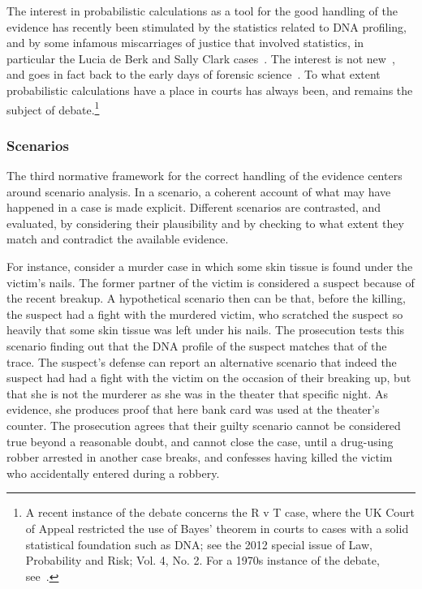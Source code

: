 \documentclass[10pt]{article}
\begin{document}
The interest in probabilistic calculations as a tool for the good handling of the evidence has recently been stimulated by the statistics related to DNA profiling, and by some infamous miscarriages of justice that involved statistics, in particular the Lucia de Berk and Sally Clark cases~\citep{dawidEtal2011,fenton2011,schnepsColmez2013}. The interest is not new~\citep{tillers2011}, and goes in fact back to the early days of forensic science~\citep{taroniEtal1998}. To what extent probabilistic calculations have a place in courts has always been, and remains the subject of debate.\footnote{A recent instance of the debate concerns the R v T case, where the UK Court of Appeal restricted the use of Bayes' theorem in courts to cases with a solid statistical foundation such as DNA; see the 2012 special issue of Law, Probability and Risk; Vol. 4, No. 2. For a 1970s instance of the debate, see~\citet{finkelsteinFairley1970,tribe1971}.}

\subsubsection{Scenarios}

The third normative framework for the correct handling of the evidence centers around scenario analysis. In a scenario, a coherent account of what may have happened in a case is made explicit. Different scenarios are contrasted, and evaluated, by considering their plausibility and by checking to what extent they match and contradict the available evidence. 

For instance, consider a murder case in which some skin tissue is found under the victim's nails. The former partner of the victim is considered a suspect because of the recent breakup. A hypothetical scenario then can be that, before the killing, the suspect had a fight with the murdered victim, who scratched the suspect so heavily that some skin tissue was left under his nails. The prosecution tests this scenario finding out that the DNA profile of the suspect matches that of the trace. The suspect's defense can report an alternative scenario that indeed the suspect had had a fight with the victim on the occasion of their breaking up, but that she is not the murderer as she was in the theater that specific night. As evidence, she produces proof that here bank card was used at the theater's counter. The prosecution agrees that their guilty scenario cannot be considered true beyond a reasonable doubt, and cannot close the case, until a drug-using robber arrested in another case breaks, and confesses having killed the victim who accidentally entered during a robbery.
\end{document}
